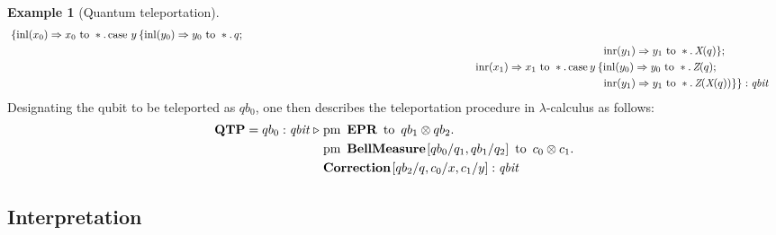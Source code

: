 \documentclass[10pt,a4paper]{amsart}
\theoremstyle{definition}
\theoremstyle{definition}
\newtheorem{example}[definition]{Example}
\theoremstyle{definition}
\theoremstyle{definition}
\theoremstyle{definition}
\theoremstyle{definition}
\begin{document}
\begin{example}[Quantum teleportation]
\begin{align*}
        \hspace{2pt}  \{\inl (x_{0}) \Rightarrow 
                x_0 \text{ to } \ast. \, \text{case }
                y  \hspace{2pt}  \{\inl (y_{0})  \Rightarrow  y_0 \text{ to } \ast.
                        \, q; 
                \\
   &   \hspace{333pt} \inr (y_{1}) \Rightarrow y_1 \text{ to } \ast. \, \emph{X}
(q)\} ; \\ 
   & \hspace{215pt}\inr (x_{1})  \Rightarrow x_1 \text{ to } \ast. \,
        \text{case}\hspace{2pt} y \hspace{2pt}  \{\inl (y_{0})  \Rightarrow
        y_0 \text{ to } \ast. \, \emph{Z}(q);  
\\ 
   &\hspace{333pt} \inr (y_{1}) \Rightarrow{} y_1 \text{ to } \ast. \, \emph{Z}
(\emph{X}(q)) \}\} : \emph{qbit}
\end{align*}
Designating the qubit to be teleported as $qb_0$, one then describes the
teleportation procedure in $\lambda$-calculus as follows:
 \begin{align*}
  \textbf{QTP} = qb_{0}: \textit{qbit}\hspace{3 pt} \triangleright \hspace{3 pt} & \text{pm} \hspace{5pt} \textbf{EPR} \hspace{5pt} \text{to} \hspace{5pt}  qb_{1} \otimes qb_{2}.  \notag \\
     & \text{pm}\hspace{5pt} \textbf{BellMeasure} \hspace{1pt} [qb_0/q_1,qb_{1}/q_2] \hspace{5pt}  \text{to} \hspace{5pt} c_{0}\otimes c_{1} . \notag \\
     & \textbf{Correction} \hspace{1pt} [qb_{2}/q,c_{0}/x, c_{1}/y] 
     : \emph{qbit} 
 \end{align*}

\end{example}
 
 \subsection{Interpretation}
\end{document}
